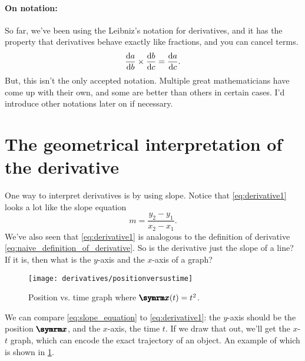 \paragraph{On notation:} So far, we've been using the Leibniz's notation for derivatives, and it has the property that derivatives behave exactly like fractions, and you can cancel terms.
\begin{equation}
    \odv{a}{b}\times\odv{b}{c} = \odv{a}{c}.\label{eq:prechainrule}
\end{equation}
But, this isn't the only accepted notation. Multiple great mathematicians have come up with their own, and some are better than others in certain cases. I'd introduce other notations later on if necessary.

\section{The geometrical interpretation of the derivative}

One way to interpret derivatives is by using slope. Notice that \cref{eq:derivative1} looks a lot like the slope equation
\begin{equation}
    m = \frac{y_2 - y_1}{x_2 - x_1}. \label{eq:slope_equation}
\end{equation}
We've also seen that \cref{eq:derivative1} is analogous to the definition of derivative \cref{eq:naive_definition_of_derivative}. So is the derivative just the slope of a line? If it is, then what is the $y$-axis and the $x$-axis of a graph?

\begin{wrapfigure}[10]{l}{0.43\textwidth}
        \centering
        \texttt{[image: derivatives/positionversustime]}
        \caption{Position vs. time graph where $\protect\vv{x}(t) = t^2$.}
        \label{fig:position_versus_time}
\end{wrapfigure}

We can compare \cref{eq:slope_equation} to \cref{eq:derivative1}: the $y$-axis should be the position $\vv{x}$, and the $x$-axis, the time $t$. If we draw that out, we'll get the $x$-$t$ graph, which can encode the exact trajectory of an object. An example of which is shown in \cref{fig:position_versus_time}.

